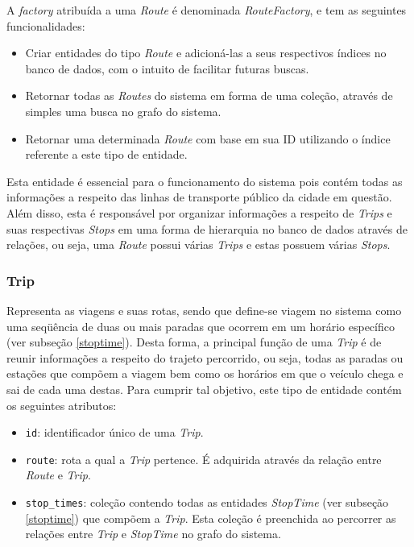 A \emph{factory} atribuída a uma \emph{Route} é denominada \emph{RouteFactory}, e tem as seguintes funcionalidades:
\begin{itemize}
	\item Criar entidades do tipo \emph{Route} e adicioná-las a seus respectivos índices no banco de dados, com o intuito de facilitar futuras buscas.
	\item Retornar todas as \emph{Routes} do sistema em forma de uma coleção, através de simples uma busca no grafo do sistema.
	\item Retornar uma determinada \emph{Route} com base em sua ID utilizando o índice referente a este tipo de entidade.
\end{itemize}

Esta entidade é essencial para o funcionamento do sistema pois contém todas as informações a respeito das linhas de transporte público da cidade em questão.
Além disso, esta é responsável por organizar informações a respeito de \emph{Trips} e suas respectivas \emph{Stops} em uma forma de hierarquia no banco de dados através de relações, ou seja, uma \emph{Route} possui várias \emph{Trips} e estas possuem várias \emph{Stops}.

\subsubsection{Trip}
\label{trip}
Representa as viagens e suas rotas, sendo que define-se viagem no sistema como uma seqüência de duas ou mais paradas que ocorrem em um horário específico (ver subseção \ref{stoptime}).
Desta forma, a principal função de uma \emph{Trip} é de reunir informações a respeito do trajeto percorrido, ou seja, todas as paradas ou estações que compõem a viagem bem como os horários em que o veículo chega e sai de cada uma destas.
Para cumprir tal objetivo, este tipo de entidade contém os seguintes atributos:

\begin{itemize}
	\item \texttt{id}: identificador único de uma \emph{Trip}.
	\item \texttt{route}: rota a qual a \emph{Trip} pertence.
	É adquirida através da relação entre \emph{Route} e \emph{Trip}.
	\item \texttt{stop\_times}: coleção contendo todas as entidades \emph{StopTime} (ver subseção \ref{stoptime}) que compõem a \emph{Trip}.
	Esta coleção é preenchida ao percorrer as relações entre \emph{Trip} e \emph{StopTime} no grafo do sistema.
\end{itemize}

